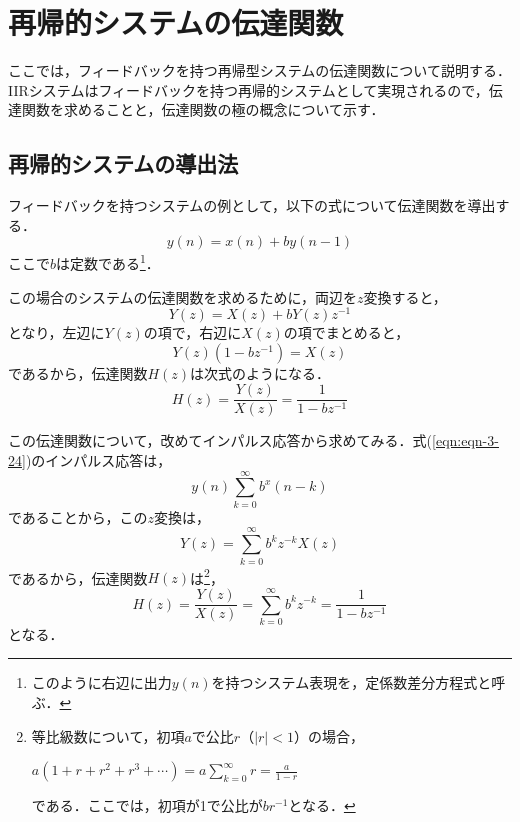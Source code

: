 \section{再帰的システムの伝達関数}

ここでは，フィードバックを持つ再帰型システムの伝達関数について説明する．
IIRシステムはフィードバックを持つ再帰的システムとして実現されるので，伝達関数を求めることと，伝達関数の極の概念について示す．

\subsection{再帰的システムの導出法}

フィードバックを持つシステムの例として，以下の式について伝達関数を導出する．
\begin{equation}
y(n)=x(n)+by(n-1)
\label{eqn:eqn-3-24}
\end{equation}
ここで$b$は定数である\footnote{このように右辺に出力$y(n)$を持つシステム表現を，定係数差分方程式と呼ぶ．}．

この場合のシステムの伝達関数を求めるために，両辺を$z$変換すると，
\begin{equation}
Y(z)=X(z)+bY(z)z^{-1}
\end{equation}
となり，左辺に$Y(z)$の項で，右辺に$X(z)$の項でまとめると，
\begin{equation}
Y(z)(1-bz^{-1})=X(z)
\end{equation}
であるから，伝達関数$H(z)$は次式のようになる．
\begin{equation}
H(z)=\frac{Y(z)}{X(z)}=\frac{1}{1-bz^{-1}}
\end{equation}

この伝達関数について，改めてインパルス応答から求めてみる．式(\ref{eqn:eqn-3-24})のインパルス応答は，
\begin{equation}
y(n)\sum_{k=0}^{\infty}b^x(n-k)
\end{equation}
であることから，この$z$変換は，
\begin{equation}
Y(z)=\sum_{k=0}^{\infty}b^kz^{-k}X(z)
\end{equation}
であるから，伝達関数$H(z)$は\footnote{等比級数について，初項$a$で公比$r$（$|r|<1$）の場合，

$\displaystyle a(1+r+r^2+r^3+\cdots) =　a\sum_{k=0}^{\infty}r = \frac{a}{1-r}$

である．ここでは，初項が1で公比が$br^{-1}$となる．
}，
\begin{equation}
H(z) = \frac{Y(z)}{X(z)} %
  = \sum_{k=0}^{\infty}b^kz^{-k} %
  = \frac{1}{1-bz^{-1}}
\end{equation}
となる．

